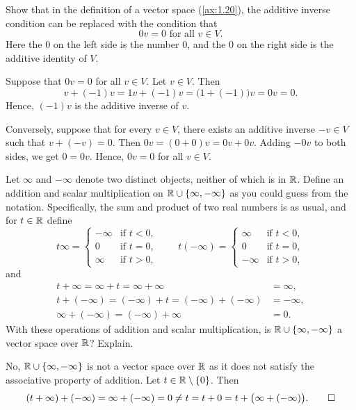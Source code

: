 \begin{exc}
\begin{exercise}
Show that in the definition of a vector space (\ref{ax:1.20}), the additive
inverse condition can be replaced with the condition that
\[ 0v=0 \text{ for all } v\in V. \]
Here the $0$ on the left side is the number $0$, and the $0$ on the right side
is the additive identity of $V$.
\end{exercise}
\begin{solution}
Suppose that $0v=0$ for all $v\in V$. Let $v\in V$. Then
\[ v+(-1)v = 1v+(-1)v = \bigl(1+(-1)\bigr)v = 0v = 0. \]
Hence, $(-1)v$ is the additive inverse of $v$.

Conversely, suppose that for every $v\in V$, there exists an additive inverse
$-v\in V$ such that $v+(-v)=0$. Then $0v=(0+0)v=0v+0v$. Adding $-0v$ to both
sides, we get $0=0v$. Hence, $0v=0$ for all $v\in V$.
\end{solution}

\begin{exercise}
Let $\infty$ and $-\infty$ denote two distinct objects, neither of which is in
$\mathbb{R}$. Define an addition and scalar multiplication on $\mathbb{R}\cup\{\infty,-\infty\}$
as you could guess from the notation. Specifically, the sum and product of two
real numbers is as usual, and for $t\in\mathbb{R}$ define
\[ t\infty = \begin{cases} -\infty & \text{if } t<0,\\ 0 & \text{if } t=0,\\
     \infty & \text{if } t>0, \end{cases}
   \qquad
   t(-\infty) = \begin{cases} \infty & \text{if } t<0,\\ 0 & \text{if } t=0,\\
     -\infty & \text{if } t>0, \end{cases} \]
and
\begin{align*}
t+\infty = \infty+t = \infty+\infty &= \infty,\\
t+(-\infty) = (-\infty)+t = (-\infty)+(-\infty) &= -\infty,\\
\infty+(-\infty) = (-\infty)+\infty &= 0.
\end{align*}
With these operations of addition and scalar multiplication, is
$\mathbb{R}\cup\{\infty,-\infty\}$ a vector space over $\mathbb{R}$? Explain.
\end{exercise}
\begin{solution}
No, $\mathbb{R}\cup\{\infty,-\infty\}$ is not a vector space over $\mathbb{R}$ as it does not
satisfy the associative property of addition. Let $t\in\mathbb{R}\setminus\{0\}$. Then
\[ (t+\infty)+(-\infty) = \infty+(-\infty) = 0 \ne t = t+0
   = t+\bigl(\infty+(-\infty)\bigr). \qedhere \]
\end{solution}


\end{exc}
